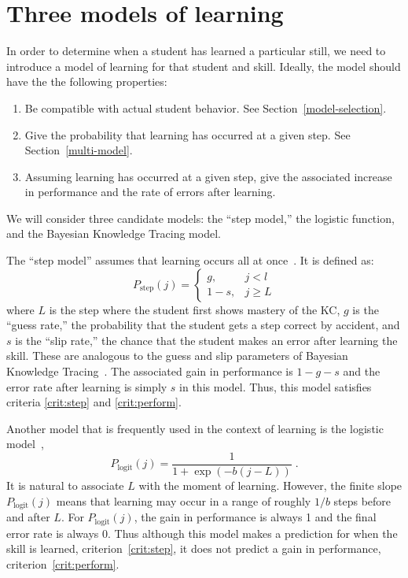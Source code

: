 \documentclass[11pt,letterpaper]{article}
\begin{document}
\section{Three models of learning}

In order to determine when a student has learned a particular still,
we need to introduce a model of learning for that student and skill.
Ideally, the model should have the the following properties:
\label{model-criteria}
%
\begin{enumerate} 

\item Be compatible with actual student behavior.
      See Section~\ref{model-selection}.

\item \label{crit:step}
      Give the probability that learning has occurred at a given step.
      See Section~\ref{multi-model}.

\item  \label{crit:perform}
      Assuming learning has occurred at a given step, give the 
     associated increase in performance and 
     the rate of errors after learning.

\end{enumerate}
%
We will consider three candidate models:  the ``step model,'' 
the logistic function, and the Bayesian Knowledge Tracing model.

The ``step model'' assumes that learning occurs all at 
once~\cite{aha-moments}.  It is defined as:
%
\begin{equation}
    P_\mathrm{step}(j)= \left\{\begin{array}{cc}
                 g, & j<l \\
                 1-s, & j\ge L 
                 \end{array} \right. 
\end{equation}
%
where $L$ is the step where the student first shows mastery of the
KC, $g$ is the ``guess rate,'' the probability that the student
gets a step correct by accident, and $s$ is the ``slip rate,''
the chance that the student makes an error after learning
the skill.  These are analogous to the guess and slip parameters 
of Bayesian Knowledge Tracing~\cite{anderson}.  
The associated gain in performance
is $1-g-s$ and the error rate after learning is simply $s$ in this
model.  Thus, this model satisfies criteria \ref{crit:step} and
\ref{crit:perform}.

Another model that is frequently used in the context of 
learning is the logistic model~\cite{logit},
%
\begin{equation}
    P_\mathrm{logit}(j)= \frac{1}{1+\exp\left(-b (j-L)\right)} \; .
\end{equation}
%
It is natural to associate $L$ with the moment of learning.  However,
the finite slope $P_\mathrm{logit}(j)$ means that learning may occur
in a range of roughly $1/b$ steps before and after $L$.    For  
$P_\mathrm{logit}(j)$, the gain in performance is always 1 and the final error
rate is always 0.  Thus although this model makes a prediction for
when the skill is learned, criterion~\ref{crit:step}, it does
not predict a gain in performance, criterion~\ref{crit:perform}.
\end{document}

